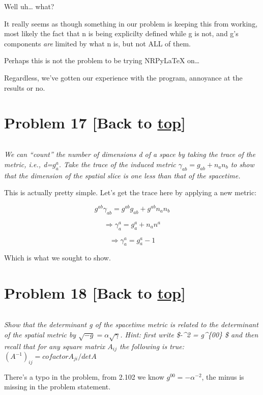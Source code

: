 \documentclass[landscape,letterpaper,10pt,english]{article}
\begin{document}
    Well uh\ldots{} what?

It really seems as though something in our problem is keeping this from
working, most likely the fact that n is being explicilty defined while g
is not, and g's components \emph{are} limited by what n is, but not ALL
of them.

Perhaps this is not the problem to be trying NRPyLaTeX on\ldots{}

Regardless, we've gotten our experience with the program, annoyance at
the results or no.

    \hypertarget{problem-17-back-to-top}{%
\section{\texorpdfstring{Problem 17 {[}Back to
\hyperref[toc]{top}{]}}{Problem 17 {[}Back to {]}}}\label{problem-17-back-to-top}}

\[\label{P17}\]

\emph{We can ``count'' the number of dimensions d of a space by taking
the trace of the metric, i.e., d=\(g^a_a\). Take the trace of the
induced metric \(\gamma_{ab} = g_{ab} + n_a n_b\) to show that the
dimension of the spatial slice is one less than that of the spacetime.}

This is actually pretty simple. Let's get the trace here by applying a
new metric:

\[g^{ab}\gamma_{ab} = g^{ab}g_{ab} + g^{ab}n_a n_b\]

\[ \Rightarrow \gamma^a_a= g^a_a + n_a n^a\]

\[ \Rightarrow \gamma^a_a= g^a_a -1\]

Which is what we sought to show.

    \hypertarget{problem-18-back-to-top}{%
\section{\texorpdfstring{Problem 18 {[}Back to
\hyperref[toc]{top}{]}}{Problem 18 {[}Back to {]}}}\label{problem-18-back-to-top}}

\[\label{P18}\]

\emph{Show that the determinant g of the spacetime metric is related to
the determinant of the spatial metric by
\(\sqrt{-g} = \alpha \sqrt{\gamma}\). Hint: first write \$-\alpha\^{}2 =
g\^{}\{00\} \$ and then recall that for any square matrix \(A_{ij}\) the
following is true: \((A^{-1})_{ij} = cofactorA_{ji}/detA\)}

There's a typo in the problem, from 2.102 we know
\(g^{00} = -\alpha^{-2}\), the minus is missing in the problem
statement.
\end{document}
